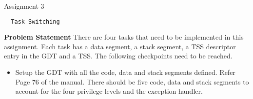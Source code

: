 \documentclass[a4paper,12pt]{report}
\begin{document}
\begin{section}{Assignment 3}
 \begin{verbatim}
  Task Switching
 \end{verbatim}
\textbf{Problem Statement} \newline\newline
There are four tasks that need to be implemented in this assignment. Each task has a data segment, a stack segment, a TSS descriptor entry in the GDT and a TSS.
The following checkpoints need to be reached.
\begin{itemize}
 \item Setup the GDT with all the code, data and stack segments defined. Refer Page 76 of the manual. There should be five code, 
data and stack segments to account for the four privilege levels and the exception handler.


\end{itemize}
\end{section}
\end{document}
